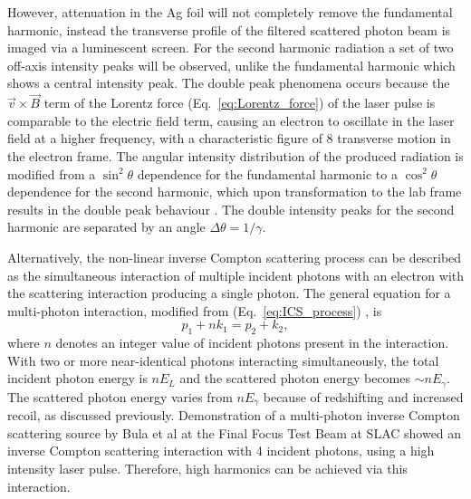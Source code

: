 \documentclass[../main.tex]{subfiles}
\begin{document}
However, attenuation in the Ag foil will not completely remove the fundamental harmonic, instead the transverse profile of the filtered scattered photon beam is imaged via a luminescent screen. For the second harmonic radiation a set of two off-axis intensity peaks will be observed, unlike the fundamental harmonic which shows a central intensity peak. The double peak phenomena occurs because the $\overrightarrow{v}\times\overrightarrow{B}$ term of the Lorentz force (Eq.~\ref{eq:Lorentz_force}) of the laser pulse is comparable to the electric field term, causing an electron to oscillate in the laser field at a higher frequency, with a characteristic figure of 8 transverse motion \cite{sarachik1970classical,jackson1999classical} in the electron frame. The angular intensity distribution of the produced radiation is modified from a $\sin^{2}\theta$ dependence for the fundamental harmonic to a $\cos^{2}\theta$ dependence for the second harmonic, which upon transformation to the lab frame results in the double peak behaviour \cite{babzien2006observation}. The double intensity peaks for the second harmonic are separated by an angle $\Delta\theta = 1/\gamma$.   

Alternatively, the non-linear inverse Compton scattering process can be described as the simultaneous interaction of multiple incident photons with an electron with the scattering interaction producing a single photon. The general equation for a multi-photon interaction, modified from (Eq.~\ref{eq:ICS_process}) \cite{bula1996observation,seipt2011nonlinear}, is
\begin{equation}
p_{1} + \mathit{n}k_{1} = p_{2} + k_{2},
\label{eq:nonlinear_electron_photon_interaction}    
\end{equation}
where $\mathit{n}$ denotes an integer value of incident photons present in the interaction. With two or more near-identical photons interacting simultaneously, the total incident photon energy is $n E_{L}$ and the scattered photon energy becomes $\sim \mathit{n}E_{\gamma}$. The scattered photon energy varies from $\mathit{n}E_{\gamma}$ because of redshifting and increased recoil, as discussed previously. Demonstration of a multi-photon inverse Compton scattering source by Bula et al \cite{bula1996observation} at the Final Focus Test Beam at SLAC \cite{burke1994results} showed an inverse Compton scattering interaction with 4 incident photons, using a high intensity laser pulse. Therefore, high harmonics can be achieved via this interaction. 
\end{document}
